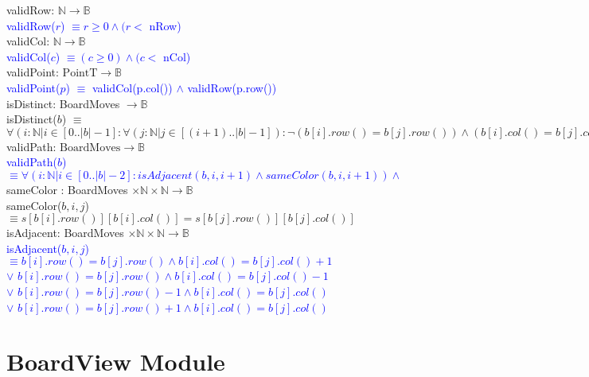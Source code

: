 \documentclass[12pt]{article}
\begin{document}
\noindent validRow: $\mathbb{N} \rightarrow \mathbb{B}$\\
\noindent \textcolor{blue}{validRow($r$) $\equiv r \geq 0 \land (r < $ nRow)} \\

\noindent validCol: $\mathbb{N} \rightarrow \mathbb{B}$\\
\noindent \textcolor{blue}{validCol($c$) $\equiv (c \geq 0) \land (c < $ nCol)} \\


\noindent validPoint: $\mbox{PointT} \rightarrow \mathbb{B}$\\
\noindent \textcolor{blue}{validPoint($p$) $\equiv$ validCol(p.col()) $\land$ validRow(p.row())}\\

\noindent isDistinct: BoardMoves $\rightarrow \mathbb{B}$\\
\noindent isDistinct($b$) $\equiv$ $\forall(i : \mathbb{N}| i \in [0..|b|-1] : \forall (j : \mathbb{N} | j \in [(i+1)..|b|-1]) : \lnot (b[i].row() = b[j].row()) \land (b[i].col() = b[j].col()) )$  \\


\noindent validPath: $\mbox{BoardMoves} \rightarrow \mathbb{B}$\\
\noindent \textcolor{blue}{validPath($b$) $\equiv \forall(i : \mathbb{N} | i \in [0..|b|-2] : isAdjacent(b,i,i+1) \land sameColor(b,i,i+1)  ) \land $}\\
 
\noindent sameColor : BoardMoves $\times \mathbb{N} \times \mathbb{N} \rightarrow \mathbb{B} $\\
\noindent sameColor($b,i,j$) $\equiv s[b[i].row()][b[i].col()] = s[b[j].row()][b[j].col()]$\\

\noindent isAdjacent: BoardMoves $\times \mathbb{N} \times \mathbb{N} \rightarrow \mathbb{B}$\\
\noindent \textcolor{blue}{isAdjacent($b,i,j$) $\equiv b[i].row() = b[j].row() \land b[i].col() = b[j].col() + 1$\\
$\lor$  $b[i].row() = b[j].row() \land b[i].col() = b[j].col() - 1$\\
$\lor$  $b[i].row() = b[j].row() - 1 \land b[i].col() = b[j].col()$\\
$\lor$  $b[i].row() = b[j].row() + 1 \land b[i].col() = b[j].col()$ }\\

\newpage

\section* {BoardView Module}
\end{document}
